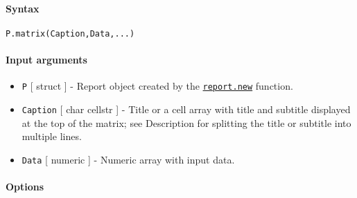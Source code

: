 


	\paragraph{Syntax}\label{syntax}

\begin{verbatim}
P.matrix(Caption,Data,...)
\end{verbatim}

\paragraph{Input arguments}\label{input-arguments}

\begin{itemize}
\item
  \texttt{P} {[} struct {]} - Report object created by the
  \href{report/new}{\texttt{report.new}} function.
\item
  \texttt{Caption} {[} char \textbar{} cellstr {]} - Title or a cell
  array with title and subtitle displayed at the top of the matrix; see
  Description for splitting the title or subtitle into multiple lines.
\item
  \texttt{Data} {[} numeric {]} - Numeric array with input data.
\end{itemize}

\paragraph{Options}\label{options}

